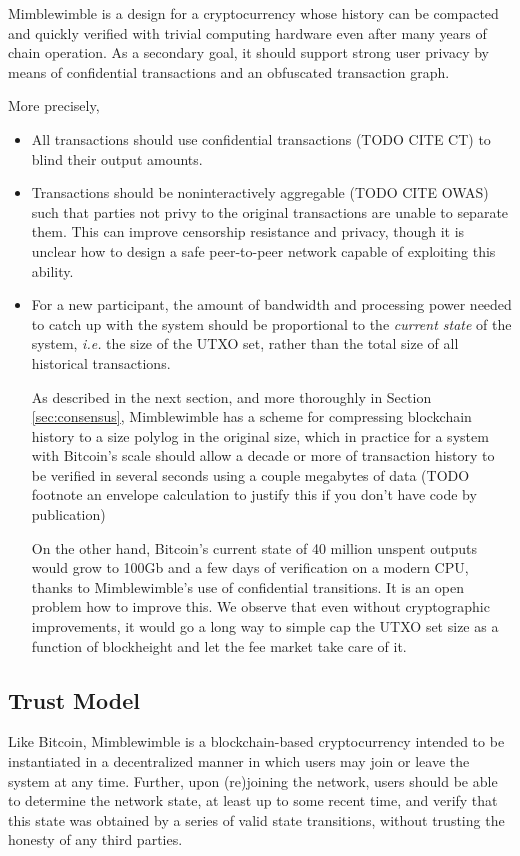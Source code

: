 \documentclass[letterpaper]{article}
\begin{document}
Mimblewimble is a design for a cryptocurrency whose history can be
compacted and quickly verified with trivial computing hardware even
after many years of chain operation. As a secondary goal, it should
support strong user privacy by means of confidential transactions
and an obfuscated transaction graph.

More precisely,
\begin{itemize}
\item All transactions should use confidential transactions (TODO CITE CT)
to blind their output amounts.

\item Transactions should be noninteractively aggregable (TODO CITE OWAS)
such that parties not privy to the original transactions are unable to
separate them. This can improve censorship resistance and privacy,
though it is unclear how to design a safe peer-to-peer network capable
of exploiting this ability.

\item For a new participant, the amount of bandwidth and processing power
needed to catch up with the system should be proportional to the \emph{current
state} of the system, \emph{i.e.} the size of the UTXO set, rather than
the total size of all historical transactions.

As described in the next section, and more thoroughly in Section
\ref{sec:consensus}, Mimblewimble has a scheme for compressing blockchain
history to a size polylog in the original size, which in practice for a
system with Bitcoin's scale should allow a decade or more of transaction
history to be verified in several seconds using a couple megabytes of data
(TODO footnote an envelope calculation to justify this if you don't
have code by publication)

On the other hand, Bitcoin's current state of 40 million unspent outputs
would grow to 100Gb and a few days of verification on a modern CPU, thanks
to Mimblewimble's use of confidential transitions. It is an open problem
how to improve this. We observe that even without cryptographic improvements,
it would go a long way to simple cap the UTXO set size as a function of
blockheight and let the fee market take care of it.
\end{itemize}

\subsection{Trust Model}

Like Bitcoin, Mimblewimble is a blockchain-based cryptocurrency intended
to be instantiated in a decentralized manner in which users may join or
leave the system at any time. Further, upon (re)joining the network, users
should be able to determine the network state, at least up to some recent
time, and verify that this state was obtained by a series of valid state
transitions, without trusting the honesty of any third parties.
\end{document}
